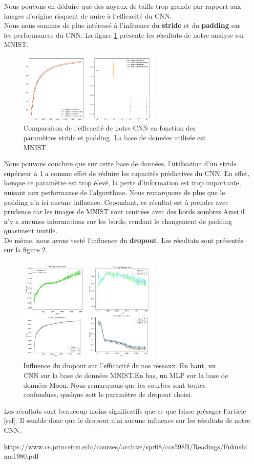 Nous pouvons en déduire que des noyaux de taille trop grande par rapport aux images d'origine risquent de nuire à l'efficacité du CNN. \\

Nous nous sommes de plus intéressé à l'influence du \textbf{stride} et du \textbf{padding} sur les performances du CNN. La figure \ref{resultat_padding_stride} présente les résultats de notre analyse sur MNIST.

\begin{figure}[!h]
\centering
\includegraphics[width=200pt]{images/cnn/CNN_padding_stride.png}
\caption{Comparaison de l'efficacité de notre CNN en fonction des paramètres stride et padding. La base de données utilisée est MNIST.}
\label{resultat_padding_stride}
\end{figure}

Nous pouvons conclure que sur cette base de données, l'utilisation d'un stride supérieur à 1 a comme effet de réduire les capacités prédictives du CNN. En effet, lorsque ce paramètre est trop élevé, la perte d'information est trop importante, nuisant aux performance de l'algorithme. Nous remarquons de plus que le padding n'a ici aucune influence. Cependant, ce résultat est à prendre avec prudence car les images de MNIST sont centrées avec des bords sombres.Ainsi il n'y a aucunes informations sur les bords, rendant le changement de padding quasiment inutile. \\

De même, nous avons testé l'influence du \textbf{dropout}. Les résultats sont présentés sur la figure \ref{resultat_dropout}.
  
\begin{figure}[!ht]
\centering
\includegraphics[width=200pt]{images/cnn/resultat_dropout.png}
\caption{Influence du dropout sur l'efficacité de nos réseaux. En haut, un CNN sur la base de données MNIST.En bas, un MLP sur la base de données Moon. Nous remarquons que les courbes sont toutes confondues, quelque soit le paramètre de dropout choisi.}
\label{resultat_dropout}
\end{figure}

Les résultats sont beaucoup moins significatifs que ce que laisse présager l'article [ref]. Il semble donc que le dropout n'ai aucune influence sur les résultats de notre CNN. 

https://www.cs.princeton.edu/courses/archive/spr08/cos598B/Readings/Fukushima1980.pdf


